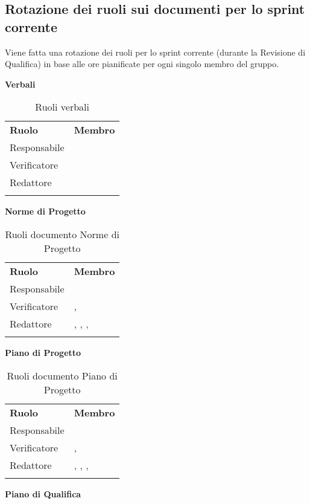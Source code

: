 	\subsection{Rotazione dei ruoli sui documenti per lo sprint corrente}
	\label{sec:rotazione}
	Viene fatta una rotazione dei ruoli per lo sprint corrente (durante la Revisione di Qualifica) in base alle ore pianificate per ogni singolo membro del gruppo.\\	
	\begin{center}
		\textbf{Verbali}
		\renewcommand{\arraystretch}{1.5}
		\begin{longtable}{  p{2.5cm} p{3.5cm} }
			\rowcolor{tableHeadYellow}
			\textbf{Ruolo}&\textbf{Membro}\\
			Responsabile & \alberto \\
			Verificatore & \luca \\
			Redattore & \matteo \\
			\rowcolor{white}
			\caption{Ruoli verbali}
			\label{sec:tabella2}
		\end{longtable}	
		\textbf{Norme di Progetto}
		\renewcommand{\arraystretch}{1.5}
		\begin{longtable}{  p{2.5cm} p{4cm} }
			\rowcolor{tableHeadYellow}
			\textbf{Ruolo}&\textbf{Membro}\\
			Responsabile & \alberto \\
			Verificatore & \mbox{\sonia}, \mbox{\alessandro} \\
			Redattore & \mbox{\matteo}, \mbox{\luca}, \mbox{\pardeep}, \mbox{\andrea} \\
			\rowcolor{white}
			\caption{Ruoli documento Norme di Progetto}
			\label{sec:tabella3}
		\end{longtable}	
		\textbf{Piano di Progetto}
		\renewcommand{\arraystretch}{1.5}
		\begin{longtable}{  p{2.5cm} p{4cm} }
			\rowcolor{tableHeadYellow}
			\textbf{Ruolo}&\textbf{Membro}\\
			Responsabile & \pardeep \\
			Verificatore & \mbox{\luca}, \mbox{\sonia} \\
			Redattore & \mbox{\matteo}, \mbox{\andrea}, \mbox{\alessandro}, \mbox{\alberto} \\
			\rowcolor{white}
			\caption{Ruoli documento Piano di Progetto}
			\label{sec:tabella4}
		\end{longtable}	
		\textbf{Piano di Qualifica}

\end{center}
